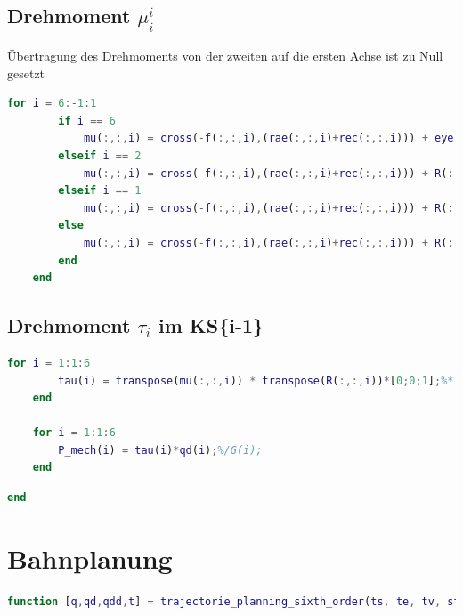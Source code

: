 \subsection{Drehmoment $\mu^{i}_i$}
Übertragung des Drehmoments von der zweiten auf die ersten Achse ist zu Null gesetzt
\begin{lstlisting}[language=Matlab, numbers=none]
	for i = 6:-1:1
		if i == 6
			mu(:,:,i) = cross(-f(:,:,i),(rae(:,:,i)+rec(:,:,i))) + eye(3)*[0;0;0] + eye(3)*cross([0;0;0], rec(:,:,i)) + I(:,:,i)*omega_d(:,:,i) + cross(omega(:,:,i),(I(:,:,i)*omega(:,:,i)));
		elseif i == 2
			mu(:,:,i) = cross(-f(:,:,i),(rae(:,:,i)+rec(:,:,i))) + R(:,:,i+1)*mu(:,:,i+1) + R(:,:,i+1)*cross(f(:,:,i+1), rec(:,:,i)) + I(:,:,i)*omega_d(:,:,i) + 	cross(omega(:,:,i),(I(:,:,i)*omega(:,:,i)))- mugrav(:,:,i);
		elseif i == 1
			mu(:,:,i) = cross(-f(:,:,i),(rae(:,:,i)+rec(:,:,i))) + R(:,:,i+1)*cross(f(:,:,i+1), rec(:,:,i)) + I(:,:,i)*omega_d(:,:,i) + 	cross(omega(:,:,i),(I(:,:,i)*omega(:,:,i)));
		else
			mu(:,:,i) = cross(-f(:,:,i),(rae(:,:,i)+rec(:,:,i))) + R(:,:,i+1)*mu(:,:,i+1) + R(:,:,i+1)*cross(f(:,:,i+1), rec(:,:,i)) + I(:,:,i)*omega_d(:,:,i) + 	cross(omega(:,:,i),(I(:,:,i)*omega(:,:,i)));
		end
	end
\end{lstlisting}
%
\subsection{Drehmoment $\tau_i$ im KS\{i-1\}}
%
\begin{lstlisting}[language=Matlab, numbers=none]
	for i = 1:1:6
		tau(i) = transpose(mu(:,:,i)) * transpose(R(:,:,i))*[0;0;1];%* G(i)
	end
	
	for i = 1:1:6
		P_mech(i) = tau(i)*qd(i);%/G(i);
	end
\end{lstlisting}
\begin{lstlisting}[language=Matlab, numbers=none]
	end
\end{lstlisting}
\section{Bahnplanung}
\label{add:traj}
%
\begin{lstlisting}[language=Matlab, numbers=none]
	function [q,qd,qdd,t] = trajectorie_planning_sixth_order(ts, te, tv, stepsize, qs, qds, qdds, qv, qe, qde, qdde)
\end{lstlisting}
\begin{lstlisting}[language=Matlab, numbers=none]
	% Bahnplanung über ein Polynom 6-ter Ordnung inkl. Gelenkwinkel-Definition des Via-Punkts
\end{lstlisting}
%
